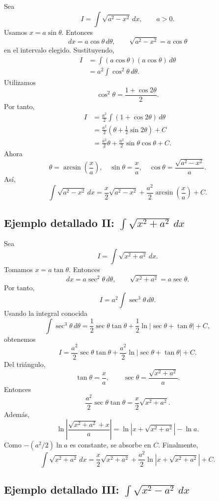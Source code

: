 \documentclass[12pt]{article}
\theoremstyle{definition}
\theoremstyle{remark}
\begin{document}
Sea
\[
I=\int\sqrt{a^2-x^2}\,dx,
\qquad a>0.
\]
Usamos $x=a\sin\theta$. Entonces
\[
dx=a\cos\theta\,d\theta,
\qquad
\sqrt{a^2-x^2}=a\cos\theta
\]
en el intervalo elegido. Sustituyendo,
\begin{align*}
I
&=\int(a\cos\theta)(a\cos\theta)\,d\theta\\
&=a^2\int\cos^2\theta\,d\theta.
\end{align*}
Utilizamos
\[
\cos^2\theta=\frac{1+\cos2\theta}{2}.
\]
Por tanto,
\begin{align*}
I
&=\frac{a^2}{2}\int(1+\cos2\theta)\,d\theta\\
&=\frac{a^2}{2}\left(\theta+\frac12\sin2\theta\right)+C\\
&=\frac{a^2}{2}\theta+\frac{a^2}{2}\sin\theta\cos\theta+C.
\end{align*}
Ahora
\[
\theta=\arcsin\left(\frac{x}{a}\right),
\quad
\sin\theta=\frac{x}{a},
\quad
\cos\theta=\frac{\sqrt{a^2-x^2}}{a}.
\]
Así,
\[
\boxed{
\int\sqrt{a^2-x^2}\,dx
=\frac{x}{2}\sqrt{a^2-x^2}
+\frac{a^2}{2}\arcsin\left(\frac{x}{a}\right)+C.}
\]

\subsection*{Ejemplo detallado II: \texorpdfstring{$\int\sqrt{x^2+a^2}\,dx$}{integral sqrt(x2+a2)}}

Sea
\[
I=\int\sqrt{x^2+a^2}\,dx.
\]
Tomamos $x=a\tan\theta$. Entonces
\[
dx=a\sec^2\theta\,d\theta,
\qquad
\sqrt{x^2+a^2}=a\sec\theta.
\]
Por tanto,
\[
I=a^2\int\sec^3\theta\,d\theta.
\]
Usando la integral conocida
\[
\int\sec^3\theta\,d\theta
=\frac12\sec\theta\tan\theta
+\frac12\ln|\sec\theta+\tan\theta|+C,
\]
obtenemos
\[
I=\frac{a^2}{2}\sec\theta\tan\theta
+\frac{a^2}{2}\ln|\sec\theta+\tan\theta|+C.
\]
Del triángulo,
\[
\tan\theta=\frac{x}{a},
\qquad
\sec\theta=\frac{\sqrt{x^2+a^2}}{a}.
\]
Entonces
\[
\frac{a^2}{2}\sec\theta\tan\theta
=\frac{x}{2}\sqrt{x^2+a^2}.
\]
Además,
\[
\ln\left|\frac{\sqrt{x^2+a^2}+x}{a}\right|
=\ln|x+\sqrt{x^2+a^2}|-\ln a.
\]
Como $-(a^2/2)\ln a$ es constante, se absorbe en $C$. Finalmente,
\[
\boxed{
\int\sqrt{x^2+a^2}\,dx
=\frac{x}{2}\sqrt{x^2+a^2}
+\frac{a^2}{2}\ln|x+\sqrt{x^2+a^2}|+C.}
\]

\subsection*{Ejemplo detallado III: \texorpdfstring{$\int\sqrt{x^2-a^2}\,dx$}{integral sqrt(x2-a2)}}
\end{document}

